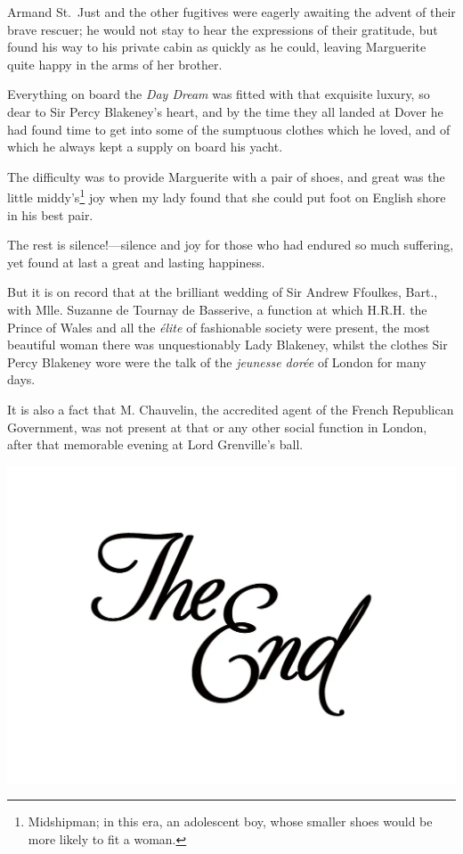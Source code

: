 \documentclass[paper=a5,BCOR=7mm,twoside,DIV=calc,12pt,usegeometry,chapterprefix,endperiod,headings=big]{scrbook}
\begin{document}
Armand St.~Just and the other fugitives were eagerly awaiting the advent of their brave rescuer; he would not stay to hear the expressions of their gratitude, but found his way to his private cabin as quickly as he could, leaving Marguerite quite happy in the arms of her brother.

Everything on board the \textit{Day Dream} was fitted with that exquisite luxury, so dear to Sir Percy Blakeney's heart, and by the time they all landed at Dover he had found time to get into some of the sumptuous clothes which he loved, and of which he always kept a supply on board his yacht.

The difficulty was to provide Marguerite with a pair of shoes, and great was the little middy's\footnote{Midshipman; in this era, an adolescent boy, whose smaller shoes would be more likely to fit a woman.} joy when my lady found that she could put foot on English shore in his best pair.

The rest is silence!---silence and joy for those who had endured so much suffering, yet found at last a great and lasting happiness.

But it is on record that at the brilliant wedding of Sir Andrew Ffoulkes, Bart., with Mlle. Suzanne de Tournay de Basserive, a function at which H.R.H. the Prince of Wales and all the \textit{élite} of fashionable society were present, the most beautiful woman there was unquestionably Lady Blakeney, whilst the clothes Sir Percy Blakeney wore were the talk of the \textit{jeunesse dorée} of London for many days.

It is also a fact that M. Chauvelin, the accredited agent of the French Republican Government, was not present at that or any other social function in London, after that memorable evening at Lord Grenville's ball.

\centering
\includegraphics[width=0.6\linewidth]{theend}
\clearpage
\vfill
\end{document}
